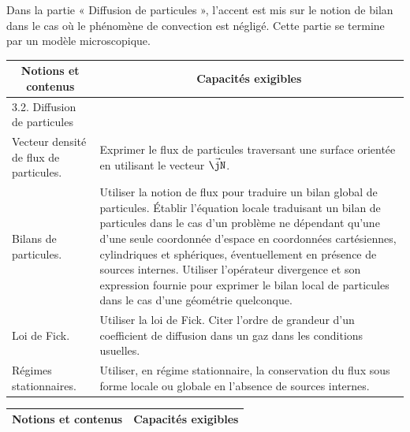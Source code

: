 \vspace{0.25cm}
Dans la partie « Diffusion de particules », l'accent est mis sur le notion de bilan dans le cas où le phénomène de convection est négligé. Cette partie se termine par un modèle microscopique.

{\tiny
\begin{minipage}[t]{0.5\textwidth}
    \begin{tabularx}{\textwidth}{|p{3cm}|X|}
    \hline 
    \multicolumn{1}{|c|}{Notions et contenus} & \multicolumn{1}{c|}{Capacités exigibles} \\
    \hline 
    3.2. Diffusion de particules & \\ 
    \hline 
    Vecteur densité de flux de particules. & Exprimer le flux de particules traversant une surface orientée en utilisant le vecteur $\Vec{\jN}$. \\
    \hline 
    Bilans de particules.  & Utiliser la notion de flux pour traduire un bilan global de particules. Établir l'équation locale traduisant un bilan de particules dans le cas d'un problème ne dépendant qu'une d'une seule coordonnée d'espace en coordonnées cartésiennes, cylindriques et sphériques, éventuellement en présence de sources internes. Utiliser l'opérateur divergence et son expression fournie pour exprimer le bilan local de particules dans le cas d'une géométrie quelconque. \\
    \hline 
    Loi de Fick. & Utiliser la loi de Fick. Citer l'ordre de grandeur d'un coefficient de diffusion dans un gaz dans les conditions usuelles. \\
    \hline 
    Régimes stationnaires. & Utiliser, en régime stationnaire, la conservation du flux sous forme locale ou globale en l'absence de sources internes. \\
    \hline 
    \end{tabularx}
\vfill
\end{minipage}%
\begin{minipage}[t]{0.5\textwidth}
    \begin{tabularx}{\textwidth}{|X|X|}
    \hline 
    \multicolumn{1}{|c|}{Notions et contenus} & \multicolumn{1}{c|}{Capacités exigibles} \\
   
    \hline 


\end{tabularx}
\end{minipage}}
